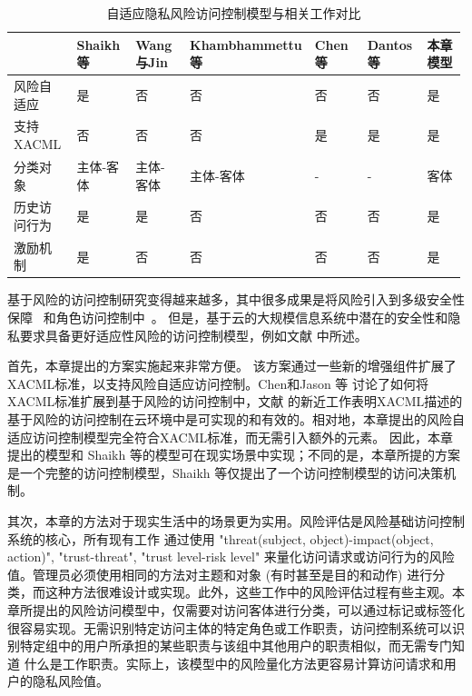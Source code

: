 \begin{table}[htbp]
	\caption{自适应隐私风险访问控制模型与相关工作对比}
	\label{tab:rabac-comparison}
	\centering
	\small
	\begin{tabular}{p{0.15\linewidth}p{0.14\linewidth}p{0.14\linewidth}p{0.14\linewidth}p{0.14\linewidth}p{0.14\linewidth}p{0.14\linewidth}}
		\toprule
		 & Shaikh等\cite{shaikh2012dynamic} & Wang与Jin\cite{wang2011quantified}& Khambhammettu等\cite{khambhammettu2013framework}& Chen等\cite{Chen2014}& Dantos等\cite{santos2014dynamic}& 本章模型\\
		\midrule
		风险自适应 & 是 &否  &否 &否 &否 &是\\
		支持XACML & 否 &否  &否 &是 &是 &是\\
		分类对象  &主体-客体 &主体-客体 &主体-客体 &- &- &客体\\
		历史访问行为 & 是 &是  &否 &否 &否 &是\\
		激励机制& 是 &否  &否 &否 &否 &是\\
		\bottomrule
	\end{tabular}
\end{table}

基于风险的访问控制研究变得越来越多，其中很多成果是将风险引入到多级安全性保障~\cite{cheng2007fuzzy,ni2010risk} 和角色访问控制中~\cite{chen2011risk,choi2015framework}。 但是，基于云的大规模信息系统中潜在的安全性和隐私要求具备更好适应性风险的访问控制模型，例如文献\cite{wang2011quantified,shaikh2012dynamic,khambhammettu2013framework} 中所述。

首先，本章提出的方案实施起来非常方便。 该方案通过一些新的增强组件扩展了XACML标准，以支持风险自适应访问控制。Chen和Jason 等\cite{Chen2013} 讨论了如何将XACML标准扩展到基于风险的访问控制中，文献\cite{santos2014dynamic} 的新近工作表明XACML描述的基于风险的访问控制在云环境中是可实现的和有效的。相对地，本章提出的风险自适应访问控制模型完全符合XACML标准，而无需引入额外的元素。 因此，本章提出的模型和 Shaikh 等\cite{shaikh2012dynamic}的模型可在现实场景中实现；不同的是，本章所提的方案是一个完整的访问控制模型，Shaikh 等\cite{shaikh2012dynamic}仅提出了一个访问控制模型的访问决策机制。

其次，本章的方法对于现实生活中的场景更为实用。风险评估是风险基础访问控制系统的核心，所有现有工作 \cite{wang2011quantified, shaikh2012dynamic, khambhammettu2013framework} 通过使用 "threat(subject, object)-impact(object, action)", "trust-threat", "trust level-risk level" 来量化访问请求或访问行为的风险值。管理员必须使用相同的方法对主题和对象 (有时甚至是目的和动作) 进行分类，而这种方法很难设计或实现。此外，这些工作中的风险评估过程有些主观。本章所提出的风险访问模型中，仅需要对访问客体进行分类，可以通过标记或标签化很容易实现。无需识别特定访问主体的特定角色或工作职责，访问控制系统可以识别特定组中的用户所承担的某些职责与该组中其他用户的职责相似，而无需专门知道 什么是工作职责。实际上，该模型中的风险量化方法更容易计算访问请求和用户的隐私风险值。

